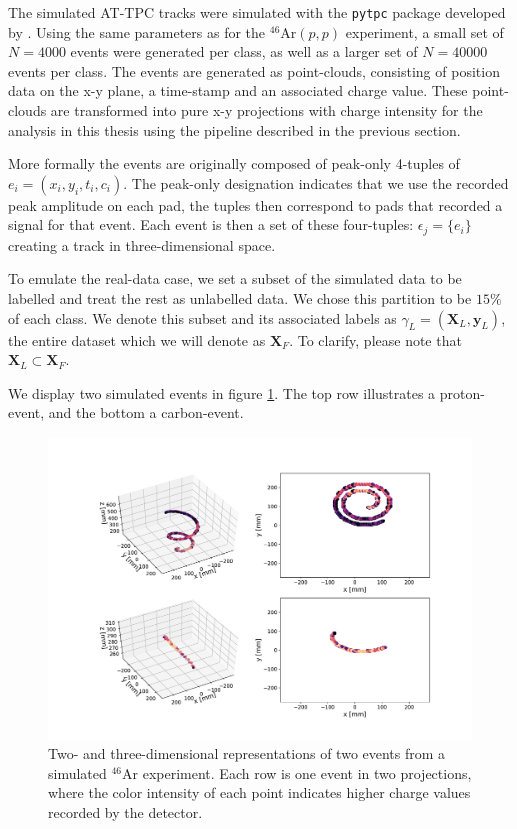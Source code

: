 \documentclass[preprint,12pt]{elsarticle}
\begin{document}
The simulated AT-TPC tracks were simulated with the \lstinline{pytpc} package developed by \citet{Bradt2017a}. Using the same parameters as for the ${}^{46}$Ar$(p, p)$ experiment, a small set of $N=4000$ events were generated per class, as well as a larger set of $N=40000$ events per class. The events are generated as point-clouds, consisting of position data on the x-y plane, a time-stamp and an associated charge value. These point-clouds are transformed into pure x-y projections with charge intensity for the analysis in this thesis using the pipeline described in the previous section. 

More formally the events are originally composed of peak-only 4-tuples of $e_i = (x_i, y_i, t_i, c_i)$. The peak-only designation indicates that we use the recorded peak amplitude on each pad, the tuples then correspond to pads that recorded a signal for that event. Each event is then a set of these four-tuples: $\epsilon_j = \{e_i\}$ creating a track in three-dimensional space. 

To emulate the real-data case, we set a subset of the simulated data to be labelled and treat the rest as unlabelled data. We chose this partition to be $15\%$ of each class. We denote this subset and its associated labels as $\gamma_L=(\boldsymbol{X}_L, \boldsymbol{y}_L)$, the entire dataset which we will denote as $\boldsymbol{X}_F$. To clarify, please note that $\boldsymbol{X}_L \subset \boldsymbol{X}_F$.

We display two simulated events in figure \ref{fig:sim_samples}. The top row illustrates a proton-event, and the bottom a carbon-event. 

\begin{figure}[ht]
\centering
\includegraphics[width=\textwidth]{plots/display_eventssimulated.pdf}
\caption[Displaying simulated events in 2D and 3D]{Two- and three-dimensional representations of two events from a simulated ${}^{46}$Ar experiment. Each row is one event in two projections, where the color intensity of each point indicates higher charge values recorded by the detector.}\label{fig:sim_samples}
\end{figure}
\end{document}
